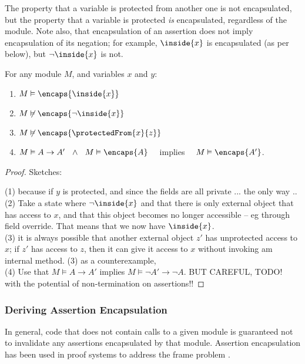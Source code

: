 The property that a variable is protected from another one is not encapsulated, but  the property that a variable is protected \emph{is} encapsulated, regardless of the module. Note also, that  encapsulation of an assertion does not imply encapsulation of its negation; 
 for example,  ${\inside{x}}$ is encapsulated (as per below), but $\neg  {\inside{x}}$ is not.


\begin{lemma}
For any module $M$, and variables $x$ and $y$:
\begin{enumerate} 
\item $M \vDash \encaps{\inside{x}}$
\item $M \not\vDash {\encaps{\neg\inside{x}}}$
\item $M \not\vDash {\encaps{\protectedFrom{x}{z}}}$
\item $M \vDash A \rightarrow A' \ \ \wedge\ \  M \vDash  \encaps{A}$ \ \ implies \ \ $M \vDash  \encaps{A'}$.
\end{enumerate}
\end{lemma}

\begin{proof} Sketches:

(1) because if $y$ is protected, and since the fields are all private ... the only way .. 
\\
(2) Take a state where $\neg\inside{x}$ and that there is only external object that has access to $x$, and that this object becomes no longer accessible -- eg through field override. That means that we now have  $\inside{x}$.
\\
(3) it is always possible that another external object $z'$ has unprotected access to $x$; if $z'$ has access to $z$, then it can give it access to $x$ without invoking am internal method. (3) as a counterexample, 
\\
(4) Use that $M \vDash A \rightarrow A'$ implies $M \vDash \neg A'  \rightarrow \neg  A$. BUT CAREFUL, TODO! with the potential of non-termination on assertions!!
\end{proof}

\subsubsection{Deriving  Assertion Encapsulation}

{In general},  code that does not contain 
calls to a {given} module is guaranteed not to invalidate any assertions encapsulated by that module.
 Assertion encapsulation has been used in proof systems to {address}   the  {frame} problem
 \cite{objInvars,encaps}. 

